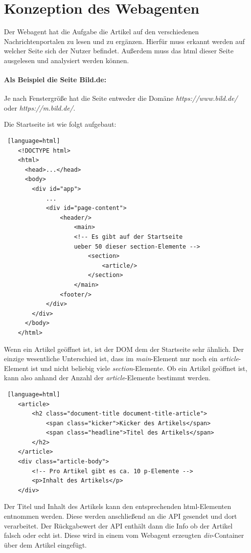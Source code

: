 \section{Konzeption des Webagenten} \label{sec:06:hauptkomponente}

Der Webagent hat die Aufgabe die Artikel auf den verschiedenen Nachrichtenportalen zu lesen und zu ergänzen.
Hierfür muss erkannt werden auf welcher Seite sich der Nutzer befindet. Außerdem muss das html dieser Seite ausgelesen und analysiert werden können.

\paragraph{Als Beispiel die Seite Bild.de:} 
Je nach Fenstergröße hat die Seite entweder die Domäne \textit{https://www.bild.de/} oder \textit{https://m.bild.de/}.

Die Startseite ist wie folgt aufgebaut:

\begin{lstlisting} [language=html]
    <!DOCTYPE html>
    <html>
      <head>...</head>
      <body>
        <div id="app">
            ...
            <div id="page-content">
                <header/>
                    <main>
                    <!-- Es gibt auf der Startseite 
                    ueber 50 dieser section-Elemente -->
                        <section>
                            <article/>
                        </section>
                    </main>
                <footer/>
            </div>    
        </div>
      </body>
    </html>
\end{lstlisting}

Wenn ein Artikel geöffnet ist, ist der DOM dem der Startseite sehr ähnlich. Der einzige wesentliche Unterschied ist, dass im \textit{main}-Element
nur noch ein \textit{article}-Element ist und nicht beliebig viele \textit{section}-Elemente.
Ob ein Artikel geöffnet ist, kann also anhand der Anzahl der \textit{article}-Elemente bestimmt werden.

\begin{lstlisting} [language=html]
    <article>
        <h2 class="document-title document-title-article">
            <span class="kicker">Kicker des Artikels</span>
            <span class="headline">Titel des Artikels</span>
        </h2>
    </article>
    <div class="article-body">
        <!-- Pro Artikel gibt es ca. 10 p-Elemente -->
        <p>Inhalt des Artikels</p>
    </div>
\end{lstlisting}

Der Titel und Inhalt des Artikels kann den entsprechenden html-Elementen entnommen werden.
Diese werden anschließend an die API gesendet und dort verarbeitet. 
Der Rückgabewert der API enthält dann die Info ob der Artikel falsch oder echt ist.
Diese wird in einem vom Webagent erzeugten \textit{div}-Container über dem Artikel eingefügt.
    
    
    